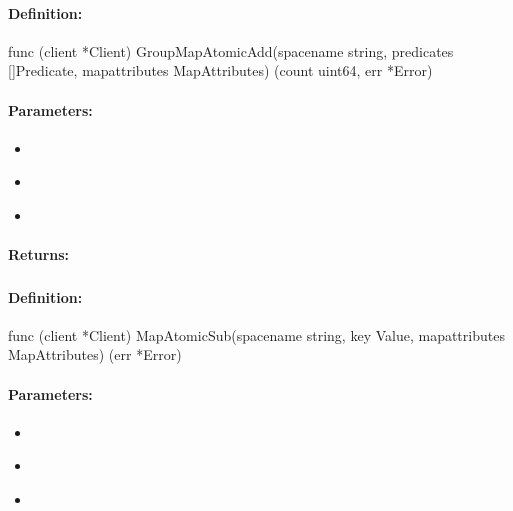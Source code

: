 \paragraph{Definition:}
\begin{gocode}
func (client *Client) GroupMapAtomicAdd(spacename string, predicates []Predicate, mapattributes MapAttributes) (count uint64, err *Error)
\end{gocode}

\paragraph{Parameters:}
\begin{itemize}[noitemsep]
\item {}\\

\item {}\\

\item {}\\

\end{itemize}

\paragraph{Returns:}


\pagebreak
\subsubsection{}
\label{api:Go:MapAtomicSub}


\paragraph{Definition:}
\begin{gocode}
func (client *Client) MapAtomicSub(spacename string, key Value, mapattributes MapAttributes) (err *Error)
\end{gocode}

\paragraph{Parameters:}
\begin{itemize}[noitemsep]
\item {}\\

\item {}\\

\item {}\\

\end{itemize}

